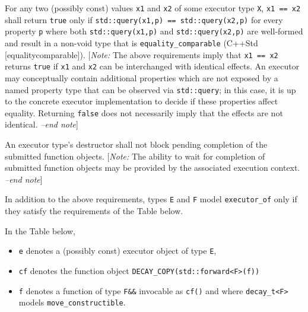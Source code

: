 \documentclass[a4paper,12pt,notitlepage,twoside,openright]{article}
\begin{document}
For any two (possibly const) values \texttt{x1} and
\texttt{x2} of some executor type \texttt{X},
\texttt{x1 == x2} shall return \texttt{true}
only if \texttt{std::query(x1,p) == std::query(x2,p)} for
every property \texttt{p} where both
\texttt{std::query(x1,p)} and
\texttt{std::query(x2,p)} are well-formed and result in a
non-void type that is \texttt{equality_comparable} (C++Std
{[}equalitycomparable{]}). {[}\emph{Note:} The above requirements imply
that \texttt{x1 == x2} returns \texttt{true} if
\texttt{x1} and \texttt{x2} can be interchanged
with identical effects. An executor may conceptually contain additional
properties which are not exposed by a named property type that can be
observed via \texttt{std::query}; in this case, it is up to
the concrete executor implementation to decide if these properties
affect equality. Returning \texttt{false} does not
necessarily imply that the effects are not identical. \emph{--end
note}{]}

An executor type's destructor shall not block pending completion of the
submitted function objects. {[}\emph{Note:} The ability to wait for
completion of submitted function objects may be provided by the
associated execution context. \emph{--end note}{]}

In addition to the above requirements, types \texttt{E} and
\texttt{F} model \texttt{executor_of} only if
they satisfy the requirements of the Table below.

In the Table below,

\begin{itemize}

\item
  \texttt{e} denotes a (possibly const) executor object of
  type \texttt{E},
\item
  \texttt{cf} denotes the function object
  \texttt{DECAY_COPY(std::forward<F>(f))}
\item
  \texttt{f} denotes a function of type
  \texttt{F&&} invocable as \texttt{cf()} and
  where \texttt{decay_t<F>} models
  \texttt{move_constructible}.
\end{itemize}
\end{document}
